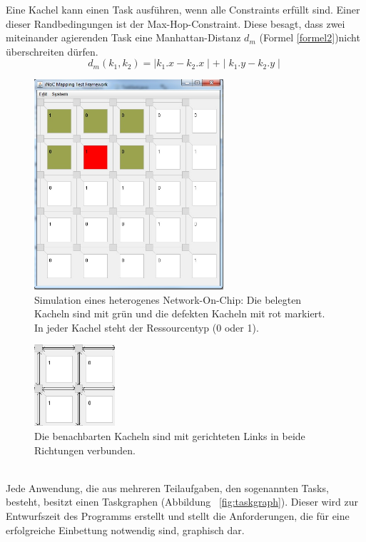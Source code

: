 Eine Kachel kann einen Task ausführen, wenn alle Constraints erfüllt sind. Einer dieser Randbedingungen ist der Max-Hop-Constraint. Diese besagt, dass zwei miteinander agierenden Task eine Manhattan-Distanz  $d_m$ (Formel \ref{formel2})nicht überschreiten dürfen. 
\begin{equation}
d_m (k_1,k_2) = \mid k_1.x - k_2.x \mid + \mid k_1.y - k_2.y \mid 
\label{formel2}
\end{equation}

\begin{figure}[H]\centering
\includegraphics[width = 70mm]{bilder/NoC.jpg}
\caption{Simulation eines heterogenes Network-On-Chip: Die belegten Kacheln sind mit grün und die defekten Kacheln mit rot markiert. In jeder Kachel steht der Ressourcentyp (0 oder 1).}\label{fig:nocbild}
\end{figure}

\begin{figure}[H]\centering
  \includegraphics[width = 30mm]{bilder/Links.jpg}
  \caption{Die benachbarten Kacheln sind mit gerichteten Links in beide Richtungen verbunden.}\label{fig:links}
\end{figure}
\ \\
Jede Anwendung, die aus mehreren Teilaufgaben, den sogenannten Tasks, besteht, besitzt einen Taskgraphen (Abbildung ~\ref{fig:taskgraph}). Dieser wird zur Entwurfszeit des Programms erstellt und stellt die Anforderungen, die für eine erfolgreiche Einbettung notwendig sind, graphisch dar.

